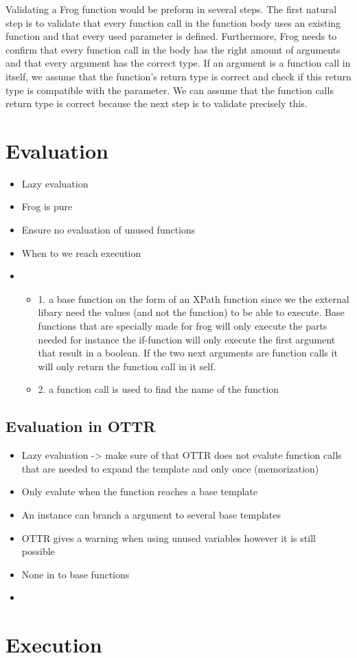\para
Validating a Frog function would be preform in several steps. The first natural step is to validate that every function call in the function body uses an existing function and that every used parameter is defined. Furthermore, Frog needs to confirm that every function call in the body has the right amount of arguments and that every argument has the correct type. If an argument is a function call in itself, we assume that the function's return type is correct and check if this return type is compatible with the parameter. We can assume that the function calls return type is correct because the next step is to validate precisely this. 

\section{Evaluation}
\begin{itemize}
    \item Lazy evaluation
    \item Frog is pure 
    \item Ensure no evaluation of unused functions 
    \item When to we reach execution 
    \item \begin{itemize}
        \item 1. a base function on the form of an XPath function since we the external libary need the values (and not the function) to be able to execute. Base functions that are specially made for frog will only execute the parts needed for instance the if-function will only execute the first argument that result in a boolean. If the two next arguments are function calls it will only return the function call in it self.
        \item 2. a function call is used to find the name of the function 
    \end{itemize}
\end{itemize}


\subsection{Evaluation in OTTR}
\begin{itemize}
    \item Lazy evaluation -> make sure of that OTTR does not evalute function calls that are needed to expand the template and only once (memorization)
    \item Only evalute when the function reaches a base template
    \item An instance can branch a argument to several base templates 
    \item OTTR gives a warning when using unused variables however it is still possible
    \item None in to base functions 
    \item 
\end{itemize}


\section{Execution}